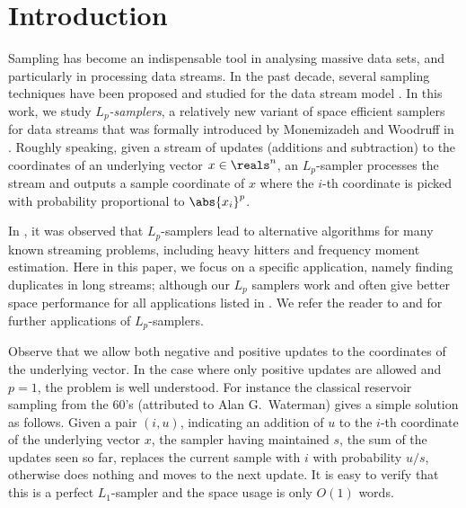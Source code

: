 
\section{Introduction}
\label{sec:intro}
Sampling has become an indispensable tool in analysing massive
data sets, and particularly in processing data streams. In the
past decade, several sampling techniques have been proposed and
studied for the data stream model \cite{BabcockDM2002,
DuffieldLT2007, BravermanOZ2009, CormodeMYZ2010,
MonemizadehW2010, AndoniKO2010}. In this work, we study {\em
$L_p$-samplers}, a relatively new variant of space efficient
samplers for data streams that was formally introduced by
Monemizadeh and Woodruff in \cite{MonemizadehW2010}. Roughly
speaking, given a stream of updates (additions and subtraction)
to the coordinates of an underlying vector $x\in\reals^n$, an
$L_p$-sampler processes the stream and outputs a sample
coordinate of $x$ where the $i$-th coordinate is picked with
probability proportional to $\abs{x_i}^p$.

In \cite{MonemizadehW2010}, it was observed that $L_p$-samplers
lead to alternative algorithms for many known streaming
problems, including heavy hitters and frequency moment
estimation. Here in this paper, we focus on a specific
application, namely finding duplicates in long streams; although
our $L_p$ samplers work and often give better space performance
for all applications listed in \cite{MonemizadehW2010}. We refer
the reader to \cite{MonemizadehW2010} and \cite{AndoniKO2010}
for further applications of $L_p$-samplers.


Observe that we allow both negative and positive updates to the
coordinates of the underlying vector. In the case where only
positive updates are allowed and $p=1$, the problem is well
understood.
For instance the classical reservoir sampling \cite{Knuth1969}
from the 60's (attributed to Alan G.~Waterman) gives a simple
solution as follows. Given a pair $(i,u)$, indicating an
addition of $u$ to the $i$-th coordinate of the underlying
vector $x$, the sampler having maintained $s$, the sum of the
updates seen so far, replaces the current sample with $i$ with
probability $u/s$, otherwise does nothing and moves to the next
update. It is easy to verify that this is a perfect
$L_1$-sampler and the space usage is only $O(1)$ words.
    
